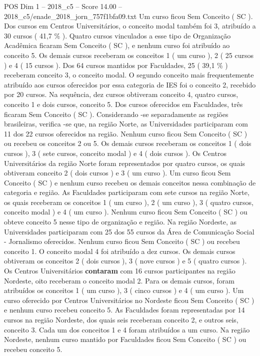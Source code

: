 \begin{textsample}{POS Dim 1 – 2018\_c5 – Score 14.00 – 2018\_c5/enade\_2018\_jorn\_757f1bfa09.txt}
Um curso ficou Sem Conceito ( SC ).
Dos cursos em Centros Universitários, o conceito modal também foi 3, atribuído a 30 cursos ( 41,7 \% ).
Quatro cursos vinculados a esse tipo de Organização Acadêmica ficaram Sem Conceito ( SC ), e nenhum curso foi atribuído ao conceito 5.
Os demais cursos receberam os conceitos 1 ( um curso ), 2 ( 25 cursos ) e 4 ( 15 cursos ).
Dos 64 cursos mantidos por Faculdades, 25 ( 39,1 \% ) receberam conceito 3, o conceito modal.
O segundo conceito mais frequentemente atribuído aos cursos oferecidos por essa categoria de IES foi o conceito 2, recebido por 20 cursos.
Na sequência, dez cursos obtiveram conceito 4, quatro cursos, conceito 1 e dois cursos, conceito 5.
Dos cursos oferecidos em Faculdades, três ficaram Sem Conceito ( SC ).
Considerando -se separadamente as regiões brasileiras, verifica -se que, na região Norte, as Universidades participaram com 11 dos 22 cursos oferecidos na região.
Nenhum curso ficou Sem Conceito ( SC ) ou recebeu os conceitos 2 ou 5.
Os demais cursos receberam os conceitos 1 ( dois cursos ), 3 ( sete cursos, conceito modal ) e 4 ( dois cursos ).
Os Centros Universitários da região Norte foram representados por quatro cursos, os quais obtiveram conceito 2 ( dois cursos ) e 3 ( um curso ).
Um curso ficou Sem Conceito ( SC ) e nenhum curso recebeu os demais conceitos nessa combinação de categoria e região.
As Faculdades participaram com sete cursos na região Norte, os quais receberam os conceitos 1 ( um curso ), 2 ( um curso ), 3 ( quatro cursos, conceito modal ) e 4 ( um curso ).
Nenhum curso ficou Sem Conceito ( SC ) ou obteve conceito 5 nesse tipo de organização e região.
Na região Nordeste, as Universidades participaram com 25 dos 55 cursos da Área de Comunicação Social - Jornalismo oferecidos.
Nenhum curso ficou Sem Conceito ( SC ) ou recebeu conceito 1.
O conceito modal 4 foi atribuído a dez cursos.
Os demais cursos obtiveram os conceitos 2 ( dois cursos ), 3 ( nove cursos ) e 5 ( quatro cursos ).
Os Centros Universitários \textbf{contaram} com 16 cursos participantes na região Nordeste, oito receberam o conceito modal 2.
Para os demais cursos, foram atribuídos os conceitos 1 ( um curso ), 3 ( cinco cursos ) e 4 ( um curso ).
Um curso oferecido por Centros Universitários no Nordeste ficou Sem Conceito ( SC ) e nenhum curso recebeu conceito 5.
As Faculdades foram representadas por 14 cursos na região Nordeste, dos quais seis receberam conceito 2, e outros seis, conceito 3.
Cada um dos conceitos 1 e 4 foram atribuídos a um curso.
Na região Nordeste, nenhum curso mantido por Faculdades ficou Sem Conceito ( SC ) ou recebeu conceito 5.

\end{textsample}
